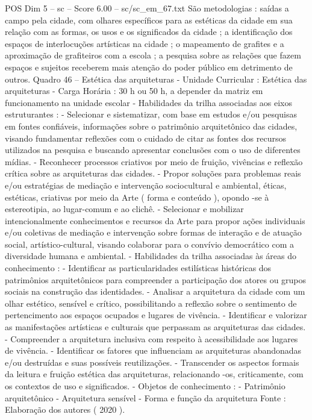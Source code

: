 \begin{textsample}{POS Dim 5 – sc – Score 6.00 – sc/sc\_em\_67.txt}
São metodologias : saídas a campo pela cidade, com olhares específicos para as estéticas da cidade em sua relação com as formas, os usos e os significados da cidade ; a identificação dos espaços de interlocuções artísticas na cidade ; o mapeamento de grafites e a aproximação de grafiteiros com a escola ; a pesquisa sobre as relações que fazem espaços e sujeitos receberem mais atenção do poder público em detrimento de outros.
Quadro 46 – Estética das arquiteturas - Unidade Curricular : Estética das arquiteturas - Carga Horária : 30 h ou 50 h, a depender da matriz em funcionamento na unidade escolar - Habilidades da trilha associadas aos eixos estruturantes : - Selecionar e sistematizar, com base em estudos e/ou pesquisas em fontes confiáveis, informações sobre o patrimônio arquitetônico das cidades, visando fundamentar reflexões com o cuidado de citar as fontes dos recursos utilizados na pesquisa e buscando apresentar conclusões com o uso de diferentes mídias. - Reconhecer processos criativos por meio de fruição, vivências e reflexão crítica sobre as arquiteturas das cidades. - Propor soluções para problemas reais e/ou estratégias de mediação e intervenção sociocultural e ambiental, éticas, estéticas, criativas por meio da Arte ( forma e conteúdo ), opondo -se à estereotipia, ao lugar-comum e ao clichê. - Selecionar e mobilizar intencionalmente conhecimentos e recursos da Arte para propor ações individuais e/ou coletivas de mediação e intervenção sobre formas de interação e de atuação social, artístico-cultural, visando colaborar para o convívio democrático com a diversidade humana e ambiental. - Habilidades da trilha associadas às áreas do conhecimento : - Identificar as particularidades estilísticas históricas dos patrimônios arquitetônicos para compreender a participação dos atores ou grupos sociais na construção das identidades. - Analisar a arquitetura da cidade com um olhar estético, sensível e crítico, possibilitando a reflexão sobre o sentimento de pertencimento aos espaços ocupados e lugares de vivência. - Identificar e valorizar as manifestações artísticas e culturais que perpassam as arquiteturas das cidades. - Compreender a arquitetura inclusiva com respeito à acessibilidade aos lugares de vivência. - Identificar os fatores que influenciam as arquiteturas abandonadas e/ou destruídas e suas possíveis reutilizações. - Transcender os aspectos formais da leitura e fruição estética das arquiteturas, relacionando -os, criticamente, com os contextos de uso e significados. - Objetos de conhecimento : - Patrimônio arquitetônico - Arquitetura sensível - Forma e função da arquitetura Fonte : Elaboração dos autores ( 2020 ).

\end{textsample}
